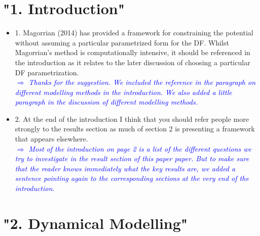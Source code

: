 \documentclass[10pt,a4paper]{article}
\newcommand{\Comment}[1]{\textsl{\textcolor{Blue}{$\Longrightarrow$ {#1}}}}
\begin{document}
\section{"1. Introduction"}
\begin{itemize}
\item 1. Magorrian (2014) has provided a framework for constraining the potential without assuming a particular parametrized form for the DF. Whilst Magorrian's method is computationally intensive, it should be referenced in the introduction as it relates to the later discussion of choosing a particular DF parametrization. \\\Comment{Thanks for the suggestion. We included the reference in the paragraph on different modelling methods in the introduction. We also added a little paragraph in the discussion of different modelling methods.}
\item 2. At the end of the introduction I think that you should refer people more strongly to the results section as much of section 2 is presenting a framework that appears elsewhere. \\\Comment{Most of the introduction on page 2 is a list of the different questions we try to investigate in the result section of this paper paper. But to make sure that the reader knows immediately what the key results are, we added a sentence pointing again to the corresponding sections at the very end of the introduction.}
\end{itemize}

\section{"2. Dynamical Modelling"}
\end{document}
